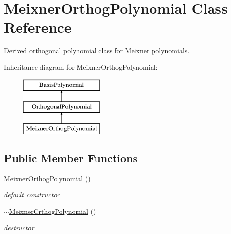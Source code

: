 \section{Meixner\+Orthog\+Polynomial Class Reference}
\label{classPecos_1_1MeixnerOrthogPolynomial}


Derived orthogonal polynomial class for Meixner polynomials.  


Inheritance diagram for Meixner\+Orthog\+Polynomial\+:\begin{figure}[H]
\begin{center}
\leavevmode
\includegraphics[height=3.000000cm]{classPecos_1_1MeixnerOrthogPolynomial}
\end{center}
\end{figure}
\subsection*{Public Member Functions}
\begin{DoxyCompactItemize}
\item 
\hyperlink{classPecos_1_1MeixnerOrthogPolynomial_a625f09ddd19a12e148fbee78be7bc642}{Meixner\+Orthog\+Polynomial} ()\label{classPecos_1_1MeixnerOrthogPolynomial_a625f09ddd19a12e148fbee78be7bc642}

\begin{DoxyCompactList}\small\item\em default constructor \end{DoxyCompactList}\item 
\hyperlink{classPecos_1_1MeixnerOrthogPolynomial_ae93759041d0eda3b1a696969097ab2b8}{$\sim$\+Meixner\+Orthog\+Polynomial} ()\label{classPecos_1_1MeixnerOrthogPolynomial_ae93759041d0eda3b1a696969097ab2b8}

\begin{DoxyCompactList}\small\item\em destructor \end{DoxyCompactList}\end{DoxyCompactItemize}
